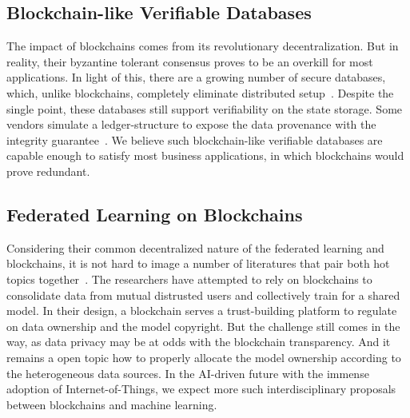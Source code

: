 \subsection{Blockchain-like Verifiable Databases}
The impact of blockchains comes from its revolutionary decentralization.
But in reality, their byzantine tolerant consensus proves to be an overkill for most applications. 
In light of this, there are a growing number of secure databases, which, unlike blockchains, completely eliminate distributed setup~\cite{arasu2017concerto,zhang2020spitz}. Despite the single point, these databases still support verifiability on the state storage. Some vendors simulate a ledger-structure to expose the data provenance with the integrity guarantee~\cite{qldb}. 
We believe such blockchain-like verifiable databases are capable enough to satisfy most business applications, in which blockchains would prove redundant. 

\subsection{Federated Learning on Blockchains}
Considering their common decentralized nature of the federated learning and blockchains, it is not hard to image a number of literatures that pair both hot topics together~\cite{lu2019blockchain,kim2019blockchained,awan2019poster}. 
The researchers have attempted to rely on blockchains to consolidate data from mutual distrusted users and collectively train for a shared model. 
In their design, a blockchain serves a trust-building platform to regulate on data ownership and the model copyright. 
But the challenge still comes in the way, as data privacy may be at odds with the blockchain transparency. 
And it remains a open topic how to properly allocate the model ownership according to the heterogeneous data sources. 
In the AI-driven future with the immense adoption of Internet-of-Things, we expect more such interdisciplinary proposals between blockchains and machine learning. 
 